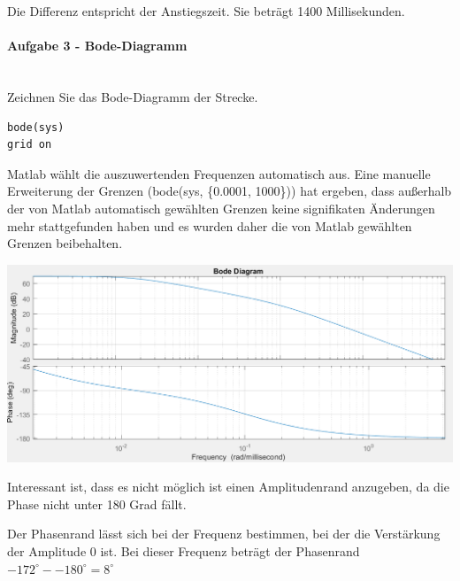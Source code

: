 \documentclass[            %
draft = false,             		%
paper = A4,                		%
pagesize = pdftex,         		%
fontsize = 10pt,           		%
DIV=15,                    		%
twoside = false,           		%
twocolumn = false,         		%
parskip = full,           		%
chapterprefix = false,      		%
appendixprefix = true,     		%
headinclude = false,       		%
footinclude = false,       		%
mpinclude = false,         		%
numbers = auto,            		%
cleardoublepage = plain,   		%
footnotes = multiple,      		%
titlepage = true,          		%
headings = normal,         		%
open = right,              		%
bibliography = openstyle,  		%
listof = chaptergapline,   		%
overfullrule = true,
]{scrbook}
\begin{document}
Die Differenz entspricht der Anstiegszeit. Sie beträgt 1400 Millisekunden.




\paragraph{Aufgabe 3 - Bode-Diagramm}~\\

Zeichnen Sie das Bode-Diagramm der Strecke.

\begin{lstlisting}[style=CStyle]
bode(sys)
grid on
\end{lstlisting}

Matlab wählt die auszuwertenden Frequenzen automatisch aus. Eine manuelle Erweiterung der Grenzen (bode(sys, \{0.0001, 1000\}))
hat ergeben, dass außerhalb der von Matlab automatisch gewählten Grenzen keine signifikaten Änderungen mehr stattgefunden haben
und es wurden daher die von Matlab gewählten Grenzen beibehalten.

\begin{center}
   \begin{minipage}[b]{1.0\textwidth}
      \includegraphics[scale=0.7]{Bilder/Bodeplot.PNG}
      \label{fig:Bodeplot} 
   \end{minipage}
\end{center}

Interessant ist, dass es nicht möglich ist einen Amplitudenrand anzugeben, da die Phase nicht unter 180 Grad fällt.

Der Phasenrand lässt sich bei der Frequenz bestimmen, bei der die Verstärkung der Amplitude 0 ist.
Bei dieser Frequenz beträgt der Phasenrand $-172^{\circ} - -180^{\circ} = 8^{\circ} $
\end{document}
